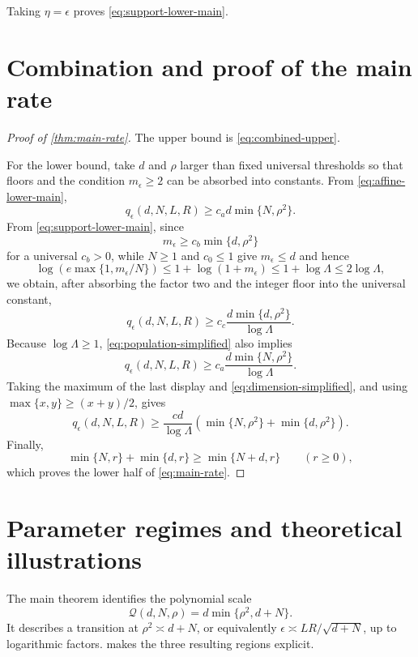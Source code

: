 \documentclass[11pt]{article}
\numberwithin{equation}{section}
\theoremstyle{remark}
\theoremstyle{definition}
\newcommand{\eps}{\epsilon}
\begin{document}
Taking $\eta=\eps$ proves \eqref{eq:support-lower-main}.

\section{Combination and proof of the main rate}
\label{sec:combine}

\begin{proof}[Proof of \cref{thm:main-rate}]
The upper bound is \eqref{eq:combined-upper}.

For the lower bound, take $d$ and $\rho$ larger than fixed universal thresholds so that floors and the condition $m_\eps\ge2$ can be absorbed into constants.  From \eqref{eq:affine-lower-main},
\begin{equation}
q_\eps(d,N,L,R)
\ge c_a d\min\{N,\rho^2\}.
\label{eq:population-simplified}
\end{equation}
From \eqref{eq:support-lower-main}, since
\[
m_\eps\ge c_b\min\{d,\rho^2\}
\]
for a universal $c_b>0$, while $N\ge1$ and $c_0\le1$ give
$m_\eps\le d$ and hence
\[
\log(e\max\{1,m_\eps/N\})
\le 1+\log(1+m_\eps)
\le 1+\log\Lambda
\le 2\log\Lambda,
\]
we obtain, after absorbing the factor two and the integer floor into
the universal constant,
\begin{equation}
q_\eps(d,N,L,R)
\ge
c_c\frac{d\min\{d,\rho^2\}}{\log\Lambda}.
\label{eq:dimension-simplified}
\end{equation}
Because $\log\Lambda\ge1$, \eqref{eq:population-simplified} also implies
\[
q_\eps(d,N,L,R)
\ge
c_a\frac{d\min\{N,\rho^2\}}{\log\Lambda}.
\]
Taking the maximum of the last display and \eqref{eq:dimension-simplified}, and using $\max\{x,y\}\ge(x+y)/2$, gives
\[
q_\eps(d,N,L,R)
\ge
\frac{c d}{\log\Lambda}
\left(\min\{N,\rho^2\}+\min\{d,\rho^2\}\right).
\]
Finally,
\[
\min\{N,r\}+\min\{d,r\}\ge\min\{N+d,r\}
\qquad(r\ge0),
\]
which proves the lower half of \eqref{eq:main-rate}.
\end{proof}

\section{Parameter regimes and theoretical illustrations}
\label{sec:regimes}

The main theorem identifies the polynomial scale
\begin{equation}
\mathcal Q(d,N,\rho)=d\min\{\rho^2,d+N\}.
\label{eq:polynomial-scale}
\end{equation}
It describes a transition at $\rho^2\asymp d+N$, or equivalently
$\eps\asymp LR/\sqrt{d+N}$, up to logarithmic factors.
 makes the three resulting regions explicit.
\end{document}

